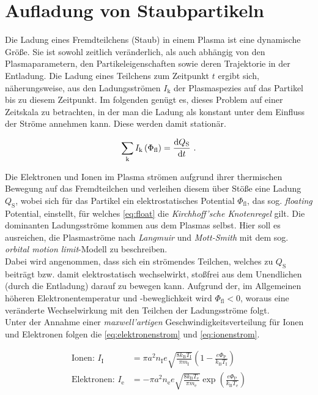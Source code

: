 \documentclass[numbers=noenddot,a4paper,notitlepage,twoside,BCOR15mm]{scrartcl}
\newcommand{\diff}{\textnormal{d}}
\newcommand{\ix}[1]{_\text{#1}}
\newcommand{\tilt}[1]{\textit{#1}}
\begin{document}
		\section{Aufladung von Staubpartikeln}\label{sub:ströme}

		Die Ladung eines Fremdteilchens (Staub) in einem Plasma ist eine dynamische Größe. Sie ist sowohl zeitlich veränderlich, als auch abhängig von den Plasmaparametern, den Partikeleigenschaften sowie deren Trajektorie in der Entladung. Die Ladung eines Teilchens zum Zeitpunkt $t$ ergibt sich, näherungsweise, aus den Ladungsströmen $I\ix{k}$ der Plasmaspezies auf das Partikel bis zu diesem Zeitpunkt. Im folgenden genügt es, dieses Problem auf einer Zeitskala zu betrachten, in der man die Ladung als konstant unter dem Einfluss der Ströme annehmen kann. Diese werden damit stationär.

			\begin{align}
				\sum_{\text{k}} I\ix{k}\left(\Phi\ix{fl}\right)=\frac{\diff Q\ix{S}}{\diff t} \,\, . \label{eq:float}
			\end{align}

		Die Elektronen und Ionen im Plasma strömen aufgrund ihrer thermischen Bewegung auf das Fremdteilchen und verleihen diesem über Stöße eine Ladung $Q\ix{S}$, wobei sich für das Partikel ein elektrostatisches Potential $\Phi\ix{fl}$, das sog. \tilt{floating} Potential, einstellt, für welches \autoref{eq:float} die \tilt{Kirchhoff'sche Knotenregel} gilt. Die dominanten Ladungsströme kommen aus dem Plasmas selbst. Hier soll es ausreichen, die Plasmaströme nach \tilt{Langmuir} und \tilt{Mott-Smith} mit dem sog. \tilt{orbital motion limit}-Modell \cite{Langmuir26} zu beschreiben.\\
		Dabei wird angenommen, dass sich ein strömendes Teilchen, welches zu $Q\ix{S}$ beiträgt bzw. damit elektrostatisch wechselwirkt, stoßfrei aus dem Unendlichen (durch die Entladung) darauf zu bewegen kann. Aufgrund der, im Allgemeinen höheren Elektronentemperatur und -beweglichkeit wird $\Phi\ix{fl}<0$, woraus eine veränderte Wechselwirkung mit den Teilchen der Ladungsströme folgt.\\
		Unter der Annahme einer \tilt{maxwell'artigen} Geschwindigkeitsverteilung für Ionen und Elektronen folgen die \autoref{eq:elektronenstrom} und \autoref{eq:ionenstrom}.

			\begin{align}
				\text{Ionen: } I\ix{I}&=\pi a^2n\ix{I}e\sqrt{\frac{8k\ix{B}T\ix{I}}{\pi m\ix{I}}}\left(1-\frac{e\Phi\ix{P}}{k\ix{B}T\ix{I}}\right) \label{eq:ionenstrom} \\
				\text{Elektronen: } I\ix{e}&=-\pi a^2n\ix{e}e\sqrt{\frac{8k\ix{B}T\ix{e}}{\pi m\ix{e}}}\exp\left(\frac{e\Phi\ix{P}}{k\ix{B}T\ix{e}}\right) \label{eq:elektronenstrom}
			\end{align}
\end{document}
